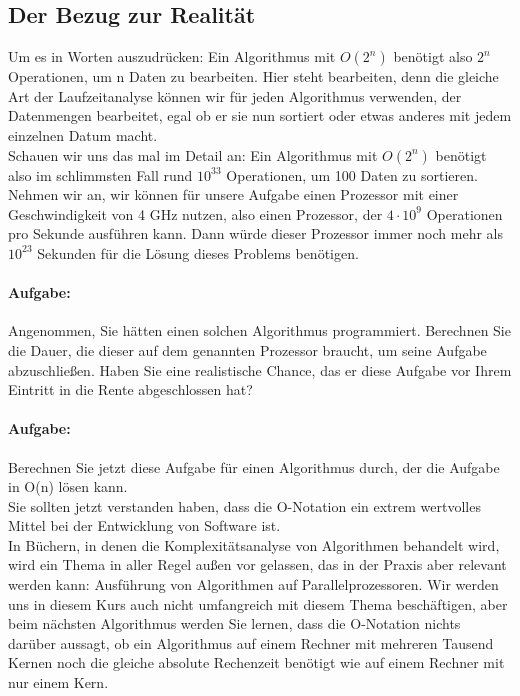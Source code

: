 \subsection{Der Bezug zur Realität}

Um es in Worten auszudrücken: Ein Algorithmus mit \(O(2^n)\) benötigt also \(2^n\) Operationen, um n Daten zu bearbeiten. Hier steht bearbeiten, denn die gleiche Art der Laufzeitanalyse können wir für jeden Algorithmus verwenden, der Datenmengen bearbeitet, egal ob er sie nun sortiert oder etwas anderes mit jedem einzelnen Datum macht.\\

Schauen wir uns das mal im Detail an: Ein Algorithmus mit \(O(2^n)\) benötigt also im schlimmsten Fall rund \(10^{33}\) Operationen, um 100 Daten zu sortieren. Nehmen wir an, wir können für unsere Aufgabe einen Prozessor mit einer Geschwindigkeit von 4 GHz nutzen, also einen Prozessor, der \(4 \cdot 10^9\) Operationen pro Sekunde ausführen kann. Dann würde dieser Prozessor immer noch mehr als \(10^{23}\) Sekunden für die Lösung dieses Problems benötigen.

\paragraph{Aufgabe:} Angenommen, Sie hätten einen solchen Algorithmus programmiert. Berechnen Sie die Dauer, die dieser auf dem genannten Prozessor braucht, um seine Aufgabe abzuschließen. Haben Sie eine realistische Chance, das er diese Aufgabe vor Ihrem Eintritt in die Rente abgeschlossen hat?

\paragraph{Aufgabe:} Berechnen Sie jetzt diese Aufgabe für einen Algorithmus durch, der die Aufgabe in O(n) lösen kann.\\

Sie sollten jetzt verstanden haben, dass die O-Notation ein extrem wertvolles Mittel bei der Entwicklung von Software ist.\\

In Büchern, in denen die Komplexitätsanalyse von Algorithmen behandelt wird, wird ein Thema in aller Regel außen vor gelassen, das in der Praxis aber  relevant werden kann: Ausführung von Algorithmen auf Parallelprozessoren. Wir werden uns in diesem Kurs auch nicht umfangreich mit diesem Thema beschäftigen, aber beim nächsten Algorithmus werden Sie lernen, dass die O-Notation nichts darüber aussagt, ob ein Algorithmus auf einem Rechner mit mehreren Tausend Kernen noch die gleiche absolute Rechenzeit benötigt wie auf einem Rechner mit nur einem Kern.\\

